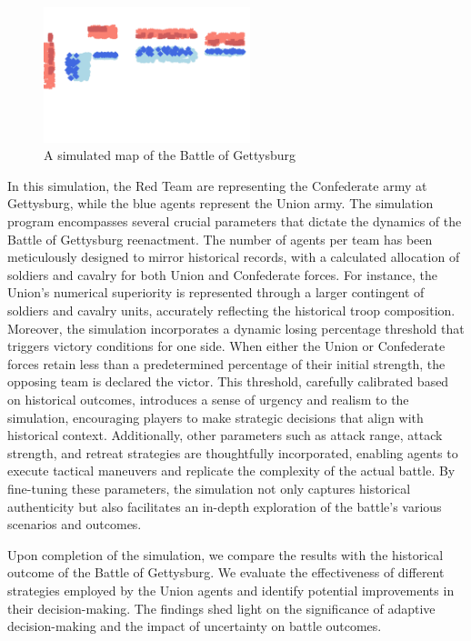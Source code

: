 \documentclass[final,5p,times,twocolumn,authoryear]{elsarticle}
\begin{document}
\begin{figure}[!ht]
  \centering
      \includegraphics[width=6cm]{sim_gett_map.png}
      \caption{A simulated map of the Battle of Gettysburg}
      \label{fig:Map}
  \centering
\end{figure}

In this simulation, the Red Team are representing the Confederate army at Gettysburg, while the blue agents represent the Union army. The simulation program encompasses several crucial parameters that dictate the dynamics of the Battle of Gettysburg reenactment. The number of agents per team has been meticulously designed to mirror historical records, with a calculated allocation of soldiers and cavalry for both Union and Confederate forces. For instance, the Union's numerical superiority is represented through a larger contingent of soldiers and cavalry units, accurately reflecting the historical troop composition. Moreover, the simulation incorporates a dynamic losing percentage threshold that triggers victory conditions for one side. When either the Union or Confederate forces retain less than a predetermined percentage of their initial strength, the opposing team is declared the victor. This threshold, carefully calibrated based on historical outcomes, introduces a sense of urgency and realism to the simulation, encouraging players to make strategic decisions that align with historical context. Additionally, other parameters such as attack range, attack strength, and retreat strategies are thoughtfully incorporated, enabling agents to execute tactical maneuvers and replicate the complexity of the actual battle. By fine-tuning these parameters, the simulation not only captures historical authenticity but also facilitates an in-depth exploration of the battle's various scenarios and outcomes.

Upon completion of the simulation, we compare the results with the historical outcome of the Battle of Gettysburg. We evaluate the effectiveness of different strategies employed by the Union agents and identify potential improvements in their decision-making. The findings shed light on the significance of adaptive decision-making and the impact of uncertainty on battle outcomes.
\end{document}
